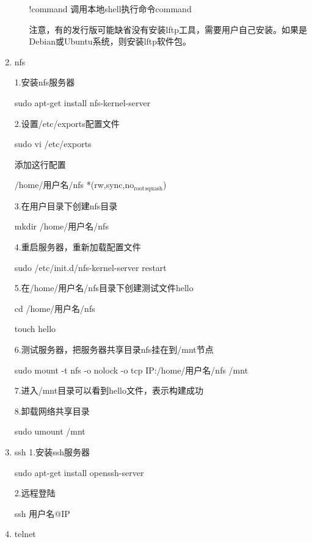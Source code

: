 \documentclass[11pt]{article}
\begin{document}
\begin{enumerate}
\begin{enumerate}
!command 调用本地shell执行命令command 

注意，有的发行版可能缺省没有安装lftp工具，需要用户自己安装。如果是Debian或Ubuntu系统，则安装lftp软件包。
\end{enumerate}

\item nfs
\label{sec-1-1-12-2}

1.安装nfs服务器

sudo apt-get install nfs-kernel-server

2.设置/etc/exports配置文件

sudo vi /etc/exports

添加这行配置

/home/用户名/nfs   *(rw,sync,no$_{\text{root}}$$_{\text{squash}}$)

3.在用户目录下创建nfs目录

mkdir /home/用户名/nfs

4.重启服务器，重新加载配置文件

sudo /etc/init.d/nfs-kernel-server restart

5.在/home/用户名/nfs目录下创建测试文件hello

cd /home/用户名/nfs

touch hello

6.测试服务器，把服务器共享目录nfs挂在到/mnt节点

sudo mount -t nfs -o nolock -o tcp IP:/home/用户名/nfs  /mnt

7.进入/mnt目录可以看到hello文件，表示构建成功

8.卸载网络共享目录

sudo umount /mnt
\item ssh
\label{sec-1-1-12-3}
1.安装ssh服务器

sudo apt-get install openssh-server

2.远程登陆

ssh 用户名@IP

\item telnet
\label{sec-1-1-12-4}
\end{enumerate}
\end{document}
